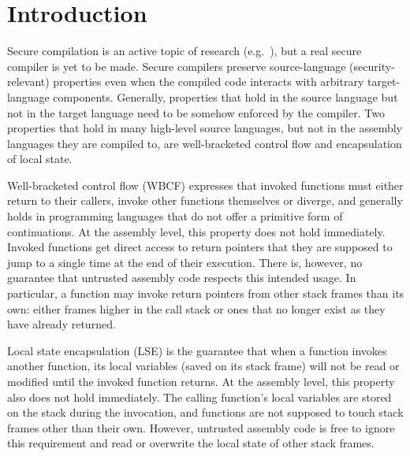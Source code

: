 \documentclass[acmsmall,screen]{acmart}\settopmatter{}
\begin{document}




\maketitle


\section{Introduction}
\label{sec:introduction}
Secure compilation is an active topic of research (e.g.~\citep{devriese_modular_2017,patrignani_hyper_2017,Abate:2018:GCG:3243734.3243745,new_universal_embedding_2016,juglaret_beyond_2016}), but a real secure compiler is yet to be made.
Secure compilers preserve source-language (security-relevant) properties even when the compiled code interacts with arbitrary target-language components.
Generally, properties that hold in the source language but not in the target language need to be somehow enforced by the compiler.
Two properties that hold in many high-level source languages, but not in the assembly languages they are compiled to, are well-bracketed control flow and encapsulation of local state.

Well-bracketed control flow (WBCF) expresses that invoked functions must either return to their callers, invoke other functions themselves or diverge, and generally holds in programming languages that do not offer a primitive form of continuations. 
At the assembly level, this property does not hold immediately. 
Invoked functions get direct access to return pointers that they are supposed to jump to a single time at the end of their execution.
There is, however, no guarantee that untrusted assembly code respects this intended usage.
In particular, a function may invoke return pointers from other stack frames than its own: either frames higher in the call stack or ones that no longer exist as they have already returned. 

Local state encapsulation (LSE) is the guarantee that when a function invokes another function, its local variables (saved on its stack frame) will not be read or modified until the invoked function returns.
At the assembly level, this property also does not hold immediately.
The calling function's local variables are stored on the stack during the invocation, and functions are not supposed to touch stack frames other than their own.
However, untrusted assembly code is free to ignore this requirement and read or overwrite the local state of other stack frames.
\end{document}
